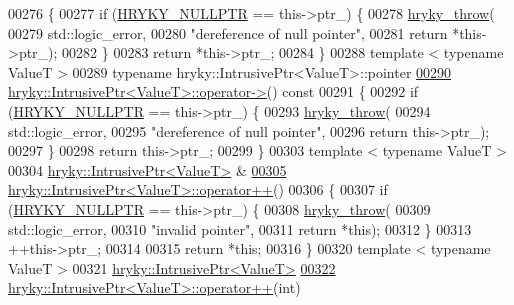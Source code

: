 \begin{DoxyCode}
00276 \textcolor{keyword}{}\{
00277     \textcolor{keywordflow}{if} (\hyperlink{common_8h_a4cd4ac09cfcdbd6b30ee69afc156e210}{HRYKY_NULLPTR} == this->ptr\_) \{
00278         \hyperlink{debug__common_8h_af50606eac4009921527ddcaed392b2c2}{hryky_throw}(
00279             std::logic\_error,
00280             \textcolor{stringliteral}{"dereference of null pointer"},
00281             \textcolor{keywordflow}{return} *this->ptr\_);
00282     \}
00283     \textcolor{keywordflow}{return} *this->ptr\_;
00284 \}
00288 \textcolor{keyword}{template} < \textcolor{keyword}{typename} ValueT >
00289 \textcolor{keyword}{typename} hryky::IntrusivePtr<ValueT>::pointer
\hypertarget{intrusive__ptr_8h_source_l00290}{}\hyperlink{classhryky_1_1_intrusive_ptr_a1be03a526ff80fbca45eed3933199434}{00290} \hyperlink{classhryky_1_1_intrusive_ptr}{hryky::IntrusivePtr<ValueT>::operator->}()\textcolor{keyword}{ const}
00291 \textcolor{keyword}{}\{
00292     \textcolor{keywordflow}{if} (\hyperlink{common_8h_a4cd4ac09cfcdbd6b30ee69afc156e210}{HRYKY_NULLPTR} == this->ptr\_) \{
00293         \hyperlink{debug__common_8h_af50606eac4009921527ddcaed392b2c2}{hryky_throw}(
00294             std::logic\_error,
00295             \textcolor{stringliteral}{"dereference of null pointer"},
00296             \textcolor{keywordflow}{return} this->ptr\_);
00297     \}
00298     \textcolor{keywordflow}{return} this->ptr\_;
00299 \}
00303 \textcolor{keyword}{template} < \textcolor{keyword}{typename} ValueT >
00304 \hyperlink{classhryky_1_1_intrusive_ptr}{hryky::IntrusivePtr<ValueT>} &
\hypertarget{intrusive__ptr_8h_source_l00305}{}\hyperlink{classhryky_1_1_intrusive_ptr_a5f0638f45388d17bb3d045494b16f09f}{00305} \hyperlink{classhryky_1_1_intrusive_ptr}{hryky::IntrusivePtr<ValueT>::operator++}()
00306 \{
00307     \textcolor{keywordflow}{if} (\hyperlink{common_8h_a4cd4ac09cfcdbd6b30ee69afc156e210}{HRYKY_NULLPTR} == this->ptr\_) \{
00308         \hyperlink{debug__common_8h_af50606eac4009921527ddcaed392b2c2}{hryky_throw}(
00309             std::logic\_error,
00310             \textcolor{stringliteral}{"invalid pointer"},
00311             \textcolor{keywordflow}{return} *\textcolor{keyword}{this});
00312     \}
00313     ++this->ptr\_;
00314     
00315     \textcolor{keywordflow}{return} *\textcolor{keyword}{this};
00316 \}
00320 \textcolor{keyword}{template} < \textcolor{keyword}{typename} ValueT >
00321 \hyperlink{classhryky_1_1_intrusive_ptr}{hryky::IntrusivePtr<ValueT>}
\hypertarget{intrusive__ptr_8h_source_l00322}{}\hyperlink{classhryky_1_1_intrusive_ptr_ae82ea1918d3643fbcc2d8ad40368233d}{00322} \hyperlink{classhryky_1_1_intrusive_ptr}{hryky::IntrusivePtr<ValueT>::operator++}(\textcolor{keywordtype}{int})

\end{DoxyCode}

